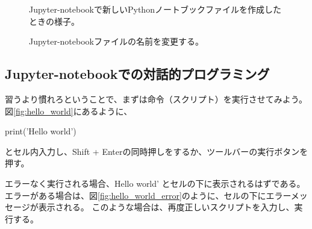 \begin{figure}[htbp]
	\centering
	\caption{
		\label{fig:Jupyter_launch2}
		Jupyter-notebookで新しいPythonノートブックファイルを作成したときの様子。
	}
\end{figure}

\begin{figure}[htbp]
	\centering
	\caption{
		\label{fig:Jupyter1}
		Jupyter-notebookファイルの名前を変更する。
	}
\end{figure}



\subsection{Jupyter-notebookでの対話的プログラミング}
習うより慣れろということで、まずは命令（スクリプト）を実行させてみよう。
図\ref{fig:hello_world}にあるように、

{\ttfamily print('Hello world')}

\noindent
とセル内入力し、Shift + Enterの同時押しをするか、ツールバーの実行ボタンを押す。

エラーなく実行される場合、{\ttfamily Hello world'} とセルの下に表示されるはずである。
エラーがある場合は、図\ref{fig:hello_world_error}のように、セルの下にエラーメッセージが表示される。
このような場合は、再度正しいスクリプトを入力し、実行する。

